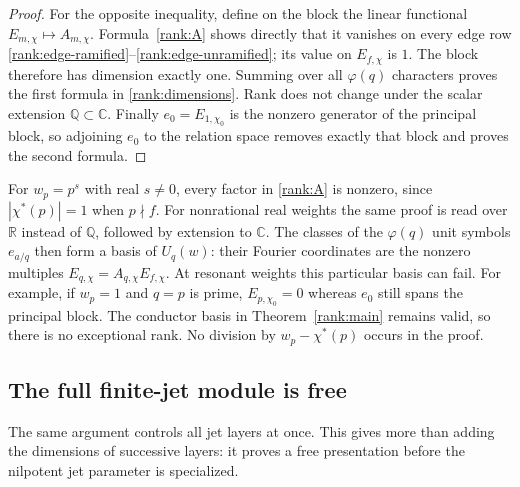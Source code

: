 \begin{proof}
For the opposite inequality, define on the block the linear functional
$E_{m,\chi}\mapsto A_{m,\chi}$.  Formula~\eqref{rank:A} shows directly
that it vanishes on every edge row
\eqref{rank:edge-ramified}--\eqref{rank:edge-unramified}; its value on
$E_{f,\chi}$ is $1$.  The block therefore has dimension exactly one.
Summing over all $\varphi(q)$ characters proves the first formula in
\eqref{rank:dimensions}.  Rank does not change under the scalar extension
$\mathbb Q\subset\mathbb C$.  Finally $e_0=E_{1,\chi_0}$ is the nonzero
generator of the principal block, so adjoining $e_0$ to the relation
space removes exactly that block and proves the second formula.
\end{proof}

\begin{remark}
\label{rank:resonance}
For $w_p=p^s$ with real $s\ne0$, every factor in
\eqref{rank:A} is nonzero, since $|\chi^*(p)|=1$ when $p\nmid f$.
For nonrational real weights the same proof is read over $\mathbb R$
instead of $\mathbb Q$, followed by extension to $\mathbb C$.
The classes of the $\varphi(q)$ unit symbols $e_{a/q}$ then form a basis
of $U_q(w)$: their Fourier coordinates are the nonzero multiples
$E_{q,\chi}=A_{q,\chi}E_{f,\chi}$.  At resonant weights this particular
basis can fail.  For example, if $w_p=1$ and $q=p$ is prime,
$E_{p,\chi_0}=0$ whereas $e_0$ still spans the principal block.
The conductor basis in Theorem~\ref{rank:main} remains valid, so there
is no exceptional rank.  No division by $w_p-\chi^*(p)$ occurs in the
proof.
\end{remark}

\subsection{The full finite-jet module is free}

The same argument controls all jet layers at once.  This gives more than
adding the dimensions of successive layers: it proves a free presentation
before the nilpotent jet parameter is specialized.

